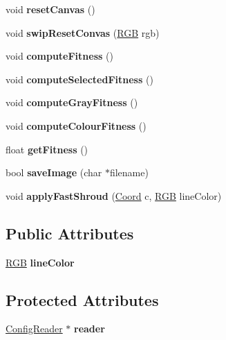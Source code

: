 \begin{DoxyCompactItemize}
void {\bfseries reset\+Canvas} ()
\item 
\hypertarget{classShroudCanvas_a25f44287b8e52d404ac0a853f2fdd158}{}\label{classShroudCanvas_a25f44287b8e52d404ac0a853f2fdd158} 
void {\bfseries swip\+Reset\+Convas} (\hyperlink{structRGB}{R\+GB} rgb)
\item 
\hypertarget{classShroudCanvas_aed1b210f02c2735df7459a992cdeb208}{}\label{classShroudCanvas_aed1b210f02c2735df7459a992cdeb208} 
void {\bfseries compute\+Fitness} ()
\item 
\hypertarget{classShroudCanvas_a93f699d62ef109a1e8c704f535feec43}{}\label{classShroudCanvas_a93f699d62ef109a1e8c704f535feec43} 
void {\bfseries compute\+Selected\+Fitness} ()
\item 
\hypertarget{classShroudCanvas_aafb22920622d9c722b46d89ac3763cd1}{}\label{classShroudCanvas_aafb22920622d9c722b46d89ac3763cd1} 
void {\bfseries compute\+Gray\+Fitness} ()
\item 
\hypertarget{classShroudCanvas_a4a52d39ad5baa0af0f75265e0c0199fe}{}\label{classShroudCanvas_a4a52d39ad5baa0af0f75265e0c0199fe} 
void {\bfseries compute\+Colour\+Fitness} ()
\item 
\hypertarget{classShroudCanvas_abf7c734ddad8bbf2f2478f27eac50c31}{}\label{classShroudCanvas_abf7c734ddad8bbf2f2478f27eac50c31} 
float {\bfseries get\+Fitness} ()
\item 
\hypertarget{classShroudCanvas_acc333c5db435c480b62f7f9e5d1acbd0}{}\label{classShroudCanvas_acc333c5db435c480b62f7f9e5d1acbd0} 
bool {\bfseries save\+Image} (char $\ast$filename)
\item 
\hypertarget{classShroudCanvas_a91e19afb81445e373c0f66983d7d7bae}{}\label{classShroudCanvas_a91e19afb81445e373c0f66983d7d7bae} 
void {\bfseries apply\+Fast\+Shroud} (\hyperlink{structCoord}{Coord} c, \hyperlink{structRGB}{R\+GB} line\+Color)
\end{DoxyCompactItemize}
\subsection*{Public Attributes}
\begin{DoxyCompactItemize}
\item 
\hypertarget{classShroudCanvas_af7eeef6a5a89f7505b51f2af640eb298}{}\label{classShroudCanvas_af7eeef6a5a89f7505b51f2af640eb298} 
\hyperlink{structRGB}{R\+GB} {\bfseries line\+Color}
\end{DoxyCompactItemize}
\subsection*{Protected Attributes}
\begin{DoxyCompactItemize}
\item 
\hypertarget{classShroudCanvas_a197da6fe72bc99a04f1900095d691233}{}\label{classShroudCanvas_a197da6fe72bc99a04f1900095d691233} 
\hyperlink{classConfigReader}{Config\+Reader} $\ast$ {\bfseries reader}
\end{DoxyCompactItemize}
